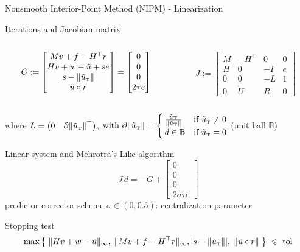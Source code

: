 \begin{frame}{Nonsmooth Interior-Point Method (NIPM) - Linearization}
  \begin{block}{{Iterations and Jacobian matrix }}
    \begin{columns}[c]
      \begin{column}{.5\textwidth}
        \begin{equation*}
          G:=\begin{bmatrix} Mv+f-H^\top r \\ Hv+w-\tilde{u}+se \\ s - \lVert\tilde{u}_{\hbox{\tiny{T}}}\rVert \\ \tilde{u} \circ r \end{bmatrix}
          = \begin{bmatrix} 0 \\ 0 \\ 0 \\ 2\tau e \end{bmatrix}
        \end{equation*}
        \quad
      \end{column}
      \begin{column}{.5\textwidth}
        \begin{equation*}
          J:=\begin{bmatrix} M & -H^\top & 0 & 0 \\ H & 0 & -I & e \\ 0 & 0 & -L & 1 \\ 0 & \tilde{U} & R & 0 \end{bmatrix}
        \end{equation*}
        \quad
      \end{column}
    \end{columns}
     where $L = \begin{pmatrix} 0 & \partial \lVert\tilde{u}_{\hbox{\tiny{T}}}\rVert^\top \end{pmatrix}$, \quad $\mbox{with } \partial \lVert\tilde{u}_{\hbox{\tiny{T}}}\rVert = \begin{cases} \frac{\tilde{u}_{\hbox{\tiny{T}}}}{\lVert\tilde{u}_{\hbox{\tiny{T}}}\rVert} & \mbox{if } \tilde{u}_{\hbox{\tiny{T}}} \neq 0 \\ d \in \mathbb B & \mbox{if } \tilde{u}_{\hbox{\tiny{T}}} = 0  \end{cases}$ (unit ball $\mathbb B$)
  \end{block}
  \begin{block}{Linear system and Mehrotra's-Like algorithm}
    $$J \, d = -G + \left[ \begin{matrix} 0 \\ 0 \\ 0 \\ 2\sigma \tau e \end{matrix}\right]$$ predictor-corrector scheme $\sigma \in (0,0.5)${\small: centralization parameter}
  \end{block}
   \begin{block}{Stopping test}
     $$\max\left\{ \; \|Hv+w-\tilde{u}\|_\infty, \; \|Mv+f-H^\top r\|_\infty, |s - \lVert\tilde{u}_{\hbox{\tiny{T}}}\rVert|, \; \|\tilde{u} \circ r\| \; \right\}  \; \leqslant \; \mbox{tol}$$
   \end{block}
 \end{frame}

